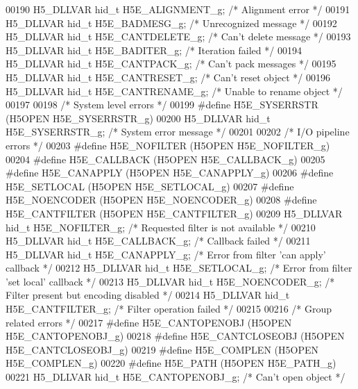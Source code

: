 \begin{DoxyCode}
00190 H5\_DLLVAR hid\_t H5E\_ALIGNMENT\_g;     \textcolor{comment}{/* Alignment error */}
00191 H5\_DLLVAR hid\_t H5E\_BADMESG\_g;       \textcolor{comment}{/* Unrecognized message */}
00192 H5\_DLLVAR hid\_t H5E\_CANTDELETE\_g;    \textcolor{comment}{/* Can't delete message */}
00193 H5\_DLLVAR hid\_t H5E\_BADITER\_g;       \textcolor{comment}{/* Iteration failed */}
00194 H5\_DLLVAR hid\_t H5E\_CANTPACK\_g;      \textcolor{comment}{/* Can't pack messages */}
00195 H5\_DLLVAR hid\_t H5E\_CANTRESET\_g;     \textcolor{comment}{/* Can't reset object */}
00196 H5\_DLLVAR hid\_t H5E\_CANTRENAME\_g;    \textcolor{comment}{/* Unable to rename object */}
00197 
00198 \textcolor{comment}{/* System level errors */}
00199 \textcolor{preprocessor}{#define H5E\_SYSERRSTR        (H5OPEN H5E\_SYSERRSTR\_g)}
00200 H5\_DLLVAR hid\_t H5E\_SYSERRSTR\_g;     \textcolor{comment}{/* System error message */}
00201 
00202 \textcolor{comment}{/* I/O pipeline errors */}
00203 \textcolor{preprocessor}{#define H5E\_NOFILTER         (H5OPEN H5E\_NOFILTER\_g)}
00204 \textcolor{preprocessor}{#define H5E\_CALLBACK         (H5OPEN H5E\_CALLBACK\_g)}
00205 \textcolor{preprocessor}{#define H5E\_CANAPPLY         (H5OPEN H5E\_CANAPPLY\_g)}
00206 \textcolor{preprocessor}{#define H5E\_SETLOCAL         (H5OPEN H5E\_SETLOCAL\_g)}
00207 \textcolor{preprocessor}{#define H5E\_NOENCODER        (H5OPEN H5E\_NOENCODER\_g)}
00208 \textcolor{preprocessor}{#define H5E\_CANTFILTER       (H5OPEN H5E\_CANTFILTER\_g)}
00209 H5\_DLLVAR hid\_t H5E\_NOFILTER\_g;      \textcolor{comment}{/* Requested filter is not available */}
00210 H5\_DLLVAR hid\_t H5E\_CALLBACK\_g;      \textcolor{comment}{/* Callback failed */}
00211 H5\_DLLVAR hid\_t H5E\_CANAPPLY\_g;      \textcolor{comment}{/* Error from filter 'can apply' callback */}
00212 H5\_DLLVAR hid\_t H5E\_SETLOCAL\_g;      \textcolor{comment}{/* Error from filter 'set local' callback */}
00213 H5\_DLLVAR hid\_t H5E\_NOENCODER\_g;     \textcolor{comment}{/* Filter present but encoding disabled */}
00214 H5\_DLLVAR hid\_t H5E\_CANTFILTER\_g;    \textcolor{comment}{/* Filter operation failed */}
00215 
00216 \textcolor{comment}{/* Group related errors */}
00217 \textcolor{preprocessor}{#define H5E\_CANTOPENOBJ      (H5OPEN H5E\_CANTOPENOBJ\_g)}
00218 \textcolor{preprocessor}{#define H5E\_CANTCLOSEOBJ     (H5OPEN H5E\_CANTCLOSEOBJ\_g)}
00219 \textcolor{preprocessor}{#define H5E\_COMPLEN          (H5OPEN H5E\_COMPLEN\_g)}
00220 \textcolor{preprocessor}{#define H5E\_PATH             (H5OPEN H5E\_PATH\_g)}
00221 H5\_DLLVAR hid\_t H5E\_CANTOPENOBJ\_g;   \textcolor{comment}{/* Can't open object */}

\end{DoxyCode}
